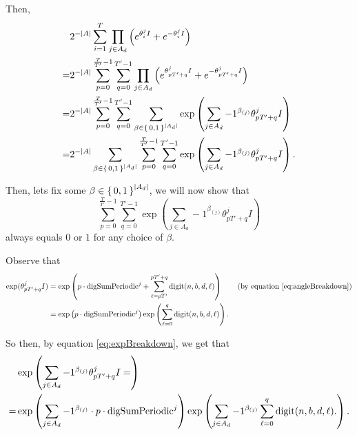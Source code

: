 \documentclass[11pt,titlepage]{article}
\newcommand{\rationalPeriodTotal}{{T}'}
\newcommand{\seedAngle}[1]{{\theta^j_{#1}}}
\newcommand{\totalPeriod}{T}
\newcommand{\digSumPeriodic}{\mathrm{digSumPeriodic}^j}
\begin{document}
Then, 
\begin{align*}
 &2^{-|A|} \sum_{i = 1}^T \prod_{j \in A_d} \left(e^{\seedAngle{i} I} +  e^{-\seedAngle{i} I}\right)\\
 =& 2^{-|A|} \sum_{p= 0}^{\frac{\totalPeriod}{\rationalPeriodTotal} - 1} \sum_{q = 0}^{\rationalPeriodTotal - 1}\prod_{j \in A_d} \left(e^{\seedAngle{p \rationalPeriodTotal + q} I} +  e^{-\seedAngle{p \rationalPeriodTotal + q} I}\right)\\
 =&
  2^{-|A|} \sum_{p= 0}^{\frac{\totalPeriod}{\rationalPeriodTotal} - 1} \sum_{q = 0}^{\rationalPeriodTotal - 1}
 \sum_{\beta \in \set{0,1}^{|A_d|}} 
    \exp\left(
        \sum_{j \in A_d} -1 ^ {\beta_{(j)}}
        \seedAngle{p \rationalPeriodTotal + q}I
      \right)\\
 =&
  2^{-|A|} 
 \sum_{\beta \in \set{0,1}^{|A_d|}} 
     \sum_{p= 0}^{\frac{\totalPeriod}{\rationalPeriodTotal} - 1} \sum_{q = 0}^{\rationalPeriodTotal - 1}
    \exp\left(
        \sum_{j \in A_d} -1 ^ {\beta_{(j)}}
        \seedAngle{p \rationalPeriodTotal + q}I
      \right).
\end{align*}

Then, lets fix some $\beta \in \set{0, 1}^{|A_d|}$, we will now show that 
\begin{equation}
\label{eq:wts01}  
  \sum_{p= 0}^{\frac{\totalPeriod}{\rationalPeriodTotal} - 1} \sum_{q = 0}^{\rationalPeriodTotal - 1}
    \exp\left(
        \sum_{j \in A_d} -1 ^ {\beta_{(j)}}
        \seedAngle{p \rationalPeriodTotal + q}I
      \right)
\end{equation}
always equals $0$ or $1$ for any choice of $\beta$.

Observe that 
\begin{align}
  \exp(\seedAngle{p \rationalPeriodTotal + q}I) &= \exp\left(p \cdot \digSumPeriodic +
    \sum_{\ell = p \rationalPeriodTotal}^{p \rationalPeriodTotal + q}\mathrm{digit}(n, b, d, \ell)\right) \tag{by equation \eqref{eq:angleBreakdown}} \\
    \label{eq:expBreakdown}
    &= \exp\left(p \cdot \digSumPeriodic\right) \exp\left(\sum_{\ell = 0}^{q}\mathrm{digit}(n, b, d, \ell)\right).
\end{align}

So then, by equation \eqref{eq:expBreakdown}, we get that
\begin{align}
&\exp\left(
    \sum_{j \in A_d} -1 ^ {\beta_{(j)}}
    \seedAngle{p \rationalPeriodTotal + q}I = 
\right)\notag \\ 
\label{eq:decomposeExp}
=&
\exp\left(
    \sum_{j \in A_d} -1 ^ {\beta_{(j)}}
    \cdot p \cdot
    \digSumPeriodic
\right)
\exp\left(
    \sum_{j \in A_d} -1 ^ {\beta_{(j)}}
      \sum_{\ell = 0}^{q}\mathrm{digit}(n, b, d, \ell).
\right).
\end{align}
\end{document}
